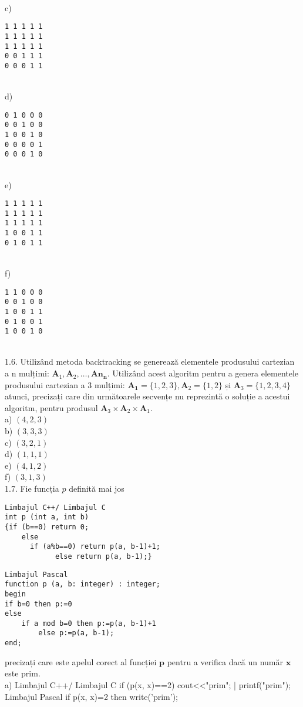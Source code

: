 \\
c) \begin{verbatim}
1 1 1 1 1
1 1 1 1 1
1 1 1 1 1
0 0 1 1 1
0 0 0 1 1
\end{verbatim}
\\
d) \begin{verbatim}
0 1 0 0 0
0 0 1 0 0
1 0 0 1 0
0 0 0 0 1
0 0 0 1 0
\end{verbatim}
\\
e) \begin{verbatim}
1 1 1 1 1
1 1 1 1 1
1 1 1 1 1
1 0 0 1 1
0 1 0 1 1
\end{verbatim}
\\
f) \begin{verbatim}
1 1 0 0 0
0 0 1 0 0
1 0 0 1 1
0 1 0 0 1
1 0 0 1 0
\end{verbatim}
\\
1.6. Utilizând metoda backtracking se generează elementele produsului cartezian a n mulțimi: $\mathbf{A}_{1}, \mathbf{A}_{2}, \ldots, \mathbf{A n}_{\mathbf{n}}$. Utilizând acest algoritm pentru a genera elementele produsului cartezian a 3 mulțimi: $\mathbf{A}_{\mathbf{1}}=\{1,2,3\}, \mathbf{A}_{2}=\{1,2\}$ și $\mathbf{A}_{3}=\{1,2,3,4\}$ atunci, precizați care din următoarele secvențe nu reprezintă o soluție a acestui algoritm, pentru produsul $\mathbf{A}_{3} \times \mathbf{A}_{2} \times \mathbf{A}_{1}$.
\\
a) $(4,2,3)$
\\
b) $(3,3,3)$
\\
c) $(3,2,1)$
\\
d) $(1,1,1)$
\\
e) $(4,1,2)$
\\
f) $(3,1,3)$
\\
1.7. Fie funcția $p$ definită mai jos
\begin{verbatim}
Limbajul C++/ Limbajul C
int p (int a, int b)
{if (b==0) return 0;
    else
      if (a%b==0) return p(a, b-1)+1;
            else return p(a, b-1);}
\end{verbatim}
\begin{verbatim}
Limbajul Pascal
function p (a, b: integer) : integer;
begin
if b=0 then p:=0
else
    if a mod b=0 then p:=p(a, b-1)+1
        else p:=p(a, b-1);
end;
\end{verbatim}
precizați care este apelul corect al funcției $\mathbf{p}$ pentru a verifica dacă un număr $\mathbf{x}$ este prim.
\\
a) Limbajul C++/ Limbajul C
if (p(x, x)==2)  cout<<"prim"; | printf("prim");
Limbajul Pascal
if p(x, x)=2 then write('prim');

